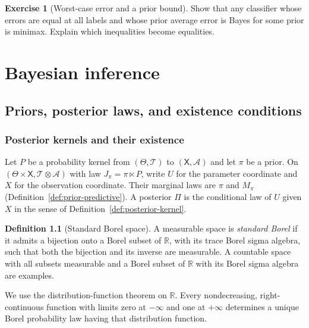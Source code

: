 \documentclass[11pt,oneside]{book}
\theoremstyle{definition}
\newtheorem{definition}[theorem]{Definition}
\newtheorem{exercise}{Exercise}[section]
\theoremstyle{remark}
\newcommand{\R}{\mathbb R}
\begin{document}
\begin{exercise}[Worst-case error and a prior bound]
\label{exer:multiple-equal-risk-prior}
Show that any classifier whose errors are equal at all labels and whose prior average error is Bayes for some prior is minimax. Explain which inequalities become equalities.
\end{exercise}


\chapter{Bayesian inference}
\label{chap:bayesian-inference}

\section{Priors, posterior laws, and existence conditions}
\label{sec:bayesian-posteriors}

\subsection{Posterior kernels and their existence}
\label{subsec:bayesian-posterior-existence}

Let $P$ be a probability kernel from $(\Theta,\mathcal T)$ to
$(\mathsf X,\mathcal A)$ and let $\pi$ be a prior. On
$(\Theta\times\mathsf X,\mathcal T\otimes\mathcal A)$ with law
$J_\pi=\pi\ltimes P$, write $U$ for the parameter coordinate and $X$
for the observation coordinate. Their marginal laws are $\pi$ and
$M_\pi$ (Definition~\ref{def:prior-predictive}). A posterior $\Pi$ is
the conditional law of $U$ given $X$ in the sense of
Definition~\ref{def:posterior-kernel}.

\begin{definition}[Standard Borel space]
\label{def:standard-borel-space}
A measurable space is \emph{standard Borel} if it admits a bijection
onto a Borel subset of $\R$, with its trace Borel sigma algebra, such
that both the bijection and its inverse are measurable. A countable
space with all subsets measurable and a Borel subset of $\R$ with
its Borel sigma algebra are examples.
\end{definition}

We use the distribution-function theorem on $\R$. Every nondecreasing,
right-continuous function with limits zero at $-\infty$ and one at
$+\infty$ determines a unique Borel probability law having that
distribution function.
\end{document}

